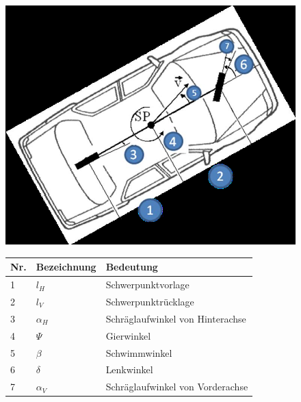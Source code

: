 \begin{figure}[H]
    \centering
    \begin{minipage}[c]{.24\linewidth}
        \centering
        \includegraphics[width=\linewidth]{Graphics/Linearen_Einspurmodell.png}
    \end{minipage}
    \begin{minipage}[c]{.75\linewidth}
        \centering
        \begin{tabular}{|p{.05\linewidth}<{\centering}|p{.115\linewidth}<{\centering}|p{.75\linewidth}<{\centering}|}
            \hline
            Nr. & Bezeichnung & Bedeutung                        \\
            \hline
            1   & $l_H$       & Schwerpunktvorlage               \\
            \hline
            2   & $l_V$       & Schwerpunktr\"ucklage            \\
            \hline
            3   & $\alpha_H$  & Schräglaufwinkel von Hinterachse \\
            \hline
            4   & $\Psi$      & Gierwinkel                       \\
            \hline
            5   & $\beta$     & Schwimmwinkel                    \\
            \hline
            6   & $\delta$    & Lenkwinkel                       \\
            \hline
            7   & $\alpha_V$  & Schräglaufwinkel von Vorderachse \\
            \hline
        \end{tabular}
    \end{minipage}
\end{figure}
